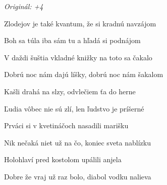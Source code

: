 \begin{song}


\begin{headerbox}
\textit{Originál: +4}
\end{headerbox}

\begin{hchordbox}
\end{hchordbox}

\Large

\bigskip

\Intro {}     \par

\bigskip

Zlodejov je také kvantum, že si kradnú navzájom \par
{}Boh sa túla iba sám tu a hľadá si podnájom \par

\bigskip

V daždi šuštia vkladné knižky na toto sa čakalo \par
{}Dobrú noc nám dajú líšky, dobrú noc nám šakalom \par

\bigskip

\begin{chorusbox}{\Refren}
Kašli drahá na slzy, odvlečiem ťa do herne \par
Ľudia vôbec nie sú zlí, len ľudstvo je príšerné \par
\end{chorusbox}

\bigskip

Prváci si v kvetináčoch nasadili marišku \par
{}Nik nečaká niet už na čo, koniec sveta nablízku \par

\bigskip

Holohlaví pred kostolom upálili anjela \par
{}Dobre že vraj už raz bolo, diabol vodku nalieva \par

\bigskip

\Refren {} \par

\bigskip


\end{song}
